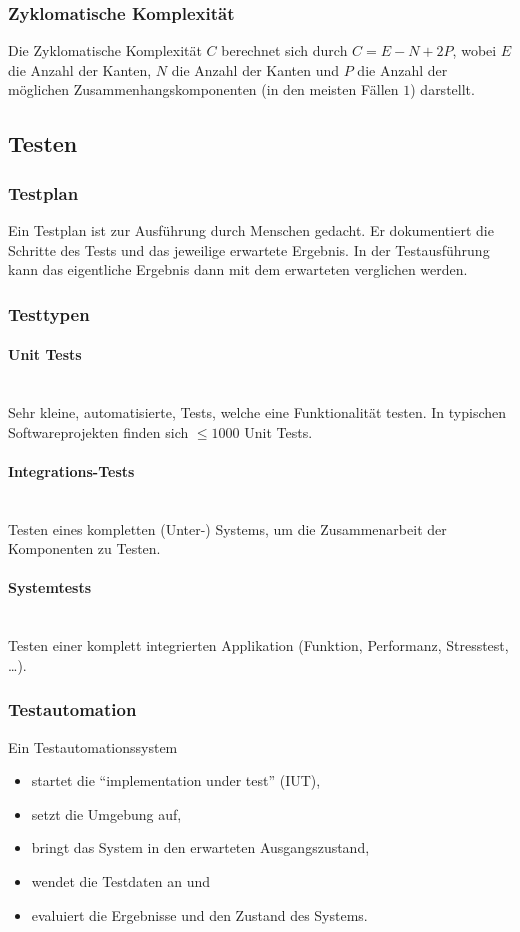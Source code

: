 \documentclass[ngerman]{tuda_summary}
\begin{document}

\subsubsection{Zyklomatische Komplexität}
Die Zyklomatische Komplexität $ C $ berechnet sich durch $ C = E - N + 2P $, wobei $ E $ die Anzahl der Kanten, $ N $ die Anzahl der Kanten und $ P $ die Anzahl der möglichen Zusammenhangskomponenten (in den meisten Fällen $ 1 $) darstellt.

\subsection{Testen}
\subsubsection{Testplan}
Ein Testplan ist zur Ausführung durch Menschen gedacht. Er dokumentiert die Schritte des Tests und das jeweilige erwartete Ergebnis. In der Testausführung kann das eigentliche Ergebnis dann mit dem erwarteten verglichen werden.

\subsubsection{Testtypen}
\paragraph{Unit Tests}\mbox{}\\
Sehr kleine, automatisierte, Tests, welche eine Funktionalität testen. In typischen Softwareprojekten finden sich $ \leq 1000 $ Unit Tests.

\paragraph{Integrations-Tests}\mbox{}\\
Testen eines kompletten (Unter-) Systems, um die Zusammenarbeit der Komponenten zu Testen.

\paragraph{Systemtests}\mbox{}\\
Testen einer komplett integrierten Applikation (Funktion, Performanz, Stresstest, \dots).

\subsubsection{Testautomation}
Ein Testautomationssystem
\begin{itemize}
    \item startet die \enquote{implementation under test} (IUT),
    \item setzt die Umgebung auf,
    \item bringt das System in den erwarteten Ausgangszustand,
    \item wendet die Testdaten an und
    \item evaluiert die Ergebnisse und den Zustand des Systems.
\end{itemize}
\end{document}
